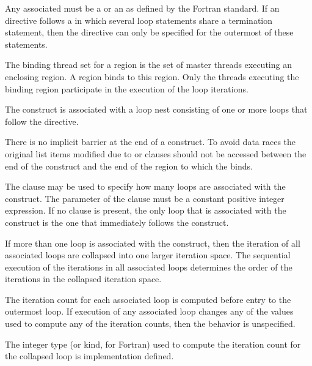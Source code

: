 {{{{Any associated  must be a  or an
 as defined by the Fortran standard. If an 
~ directive follows a  in which several loop statements share a  
termination statement, then the directive can only be specified for the outermost of these 
 statements.
\fortranspecificend

\begin{samepage}

\binding
The binding thread set for a  region is the set of master
threads executing an enclosing  region. A  region
binds to this  region. Only the threads executing the binding  region participate in the 
execution of the loop iterations.

\descr
The  construct is associated with a loop nest consisting of one or more 
loops that follow the directive.

There is no implicit barrier at the end of a  construct.
To avoid data races the original
list items modified due to  or  clauses
should not be accessed between the end of the  construct and the end
of the  region to which the  binds.

\end{samepage}

The  clause may be used to specify how many loops are associated with the 
 construct. The parameter of the  clause must be a constant 
positive integer expression. If no  clause is present, the only loop that is 
associated with the  construct is the one that immediately follows the 
 construct.

If more than one loop is associated with the  construct, then the iteration 
of all associated loops are collapsed into one larger iteration space. The sequential 
execution of the iterations in all associated loops determines the order of the iterations in 
the collapsed iteration space.

The iteration count for each associated loop is computed before entry to the outermost loop. If execution of any associated loop changes any of the values used to compute any of the iteration counts, then the behavior is unspecified. 

The integer type (or kind, for Fortran) used to compute the iteration count for the collapsed loop is implementation defined.

}}}}
